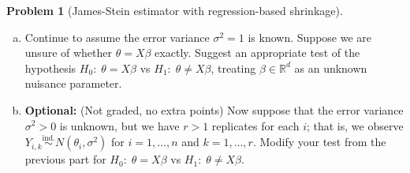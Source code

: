 \documentclass{article}
\newcommand{\RR}{\mathbb{R}}
\newcommand{\simind}{\overset{\text{ind.}}{\sim}}
\newcommand{\optional}{{\bf Optional:} (Not graded, no extra points) }
\theoremstyle{definition}
\newtheorem{problem}{Problem}
\begin{document}
\begin{problem}[James-Stein estimator with regression-based shrinkage]
\begin{enumerate}[(a)]
{\bf Hint:} The problem will become easier after an appropriate change of basis; think about how the estimator operates on different subspaces.





\item Continue to assume the error variance $\sigma^2 = 1$ is known. Suppose we are unsure of whether $\theta = X\beta$ exactly. Suggest an appropriate test of the hypothesis $H_0:\;\theta = X\beta$ vs $H_1:\; \theta \neq X\beta$, treating $\beta \in \RR^d$ as an unknown nuisance parameter.


\item \optional Now suppose that the error variance $\sigma^2>0$ is unknown, but we have $r > 1$ replicates for each $i$; that is, we observe $Y_{i,k} \simind N(\theta_i, \sigma^2)$ for $i=1,\ldots,n$ and $k=1,\ldots,r$. Modify your test from the previous part for $H_0:\;\theta = X\beta$ vs $H_1:\; \theta \neq X\beta$.


% 



\end{enumerate}
\end{problem}
\end{document}
